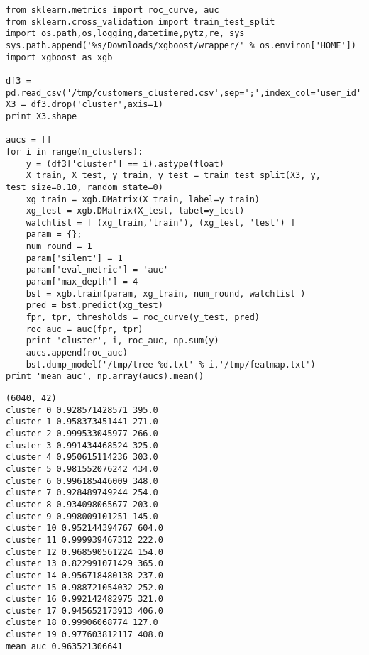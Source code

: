 \documentclass[12pt,fleqn]{article}\usepackage{../common}
\begin{document}
\begin{verbatim}
from sklearn.metrics import roc_curve, auc
from sklearn.cross_validation import train_test_split
import os.path,os,logging,datetime,pytz,re, sys
sys.path.append('%s/Downloads/xgboost/wrapper/' % os.environ['HOME'])
import xgboost as xgb

df3 = pd.read_csv('/tmp/customers_clustered.csv',sep=';',index_col='user_id')
X3 = df3.drop('cluster',axis=1)
print X3.shape

aucs = []
for i in range(n_clusters):
    y = (df3['cluster'] == i).astype(float)
    X_train, X_test, y_train, y_test = train_test_split(X3, y, test_size=0.10, random_state=0)
    xg_train = xgb.DMatrix(X_train, label=y_train)
    xg_test = xgb.DMatrix(X_test, label=y_test)    
    watchlist = [ (xg_train,'train'), (xg_test, 'test') ]    
    param = {}; 
    num_round = 1
    param['silent'] = 1
    param['eval_metric'] = 'auc'
    param['max_depth'] = 4
    bst = xgb.train(param, xg_train, num_round, watchlist )
    pred = bst.predict(xg_test)
    fpr, tpr, thresholds = roc_curve(y_test, pred)
    roc_auc = auc(fpr, tpr)
    print 'cluster', i, roc_auc, np.sum(y)
    aucs.append(roc_auc)
    bst.dump_model('/tmp/tree-%d.txt' % i,'/tmp/featmap.txt')
print 'mean auc', np.array(aucs).mean()
\end{verbatim}

\begin{verbatim}
(6040, 42)
cluster 0 0.928571428571 395.0
cluster 1 0.958373451441 271.0
cluster 2 0.999533045977 266.0
cluster 3 0.991434468524 325.0
cluster 4 0.950615114236 303.0
cluster 5 0.981552076242 434.0
cluster 6 0.996185446009 348.0
cluster 7 0.928489749244 254.0
cluster 8 0.934098065677 203.0
cluster 9 0.998009101251 145.0
cluster 10 0.952144394767 604.0
cluster 11 0.999939467312 222.0
cluster 12 0.968590561224 154.0
cluster 13 0.822991071429 365.0
cluster 14 0.956718480138 237.0
cluster 15 0.988721054032 252.0
cluster 16 0.992142482975 321.0
cluster 17 0.945652173913 406.0
cluster 18 0.99906068774 127.0
cluster 19 0.977603812117 408.0
mean auc 0.963521306641
\end{verbatim}
\end{document}

